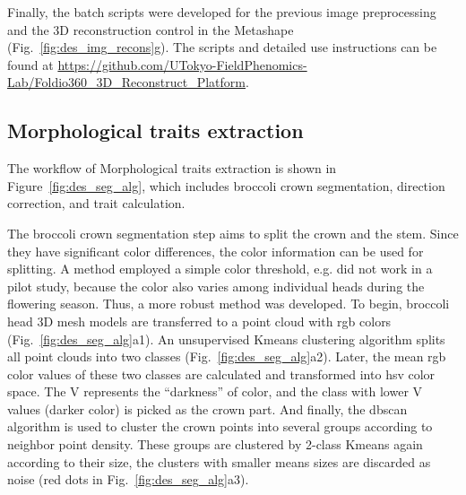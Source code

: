 Finally, the batch scripts were developed for the previous image preprocessing and the 3D reconstruction control in the Metashape (Fig.~\ref{fig:des_img_recons}g). The scripts and detailed use instructions can be found at \url{https://github.com/UTokyo-FieldPhenomics-Lab/Foldio360_3D_Reconstruct_Platform}.

\subsection{Morphological traits extraction}

The workflow of Morphological traits extraction is shown in Figure~\ref{fig:des_seg_alg}, which includes broccoli crown segmentation, direction correction, and trait calculation.



The broccoli crown segmentation step aims to split the crown and the stem. Since they have significant color differences, the color information can be used for splitting. A method employed a simple color threshold, e.g. \citet{otsu_threshold_1979} did not work in a pilot study, because the color also varies among individual heads during the flowering season. Thus, a more robust method was developed. To begin, broccoli head 3D mesh models are transferred to a point cloud with \gls{rgb} colors (Fig.~\ref{fig:des_seg_alg}a1). An unsupervised Kmeans clustering algorithm splits all point clouds into two classes (Fig.~\ref{fig:des_seg_alg}a2). Later, the mean \gls{rgb} color values of these two classes are calculated and transformed into \gls{hsv} color space. The V represents the ``darkness'' of color, and the class with lower V values (darker color) is picked as the crown part. And finally, the \gls{dbscan} algorithm is used to cluster the crown points into several groups according to neighbor point density. These groups are clustered by 2-class Kmeans again according to their size, the clusters with smaller means sizes are discarded as noise (red dots in Fig.~\ref{fig:des_seg_alg}a3).

